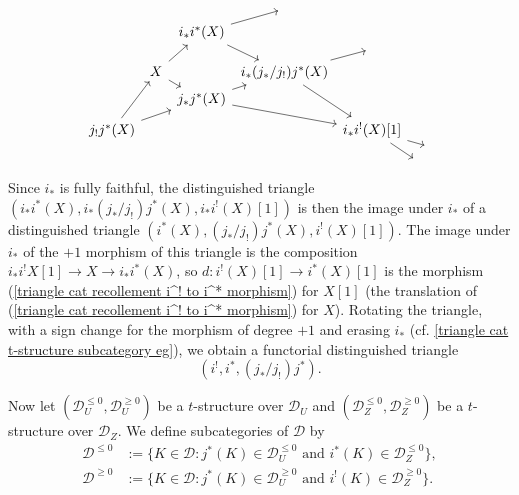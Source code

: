 \vspace*{-2mm}
\begin{equation}\label{triangle cat recollement octahedron}
\begin{tikzcd}[row sep=2pt,column sep=2pt]
&&&{}&\\
&&i_*i^*(X)\ar[ru]\ar[rdd]&&\\
&&&{}&{}\\
&X\ar[rd]\ar[ruu]&&i_*(j_*/j_!)j^*(X)\ar[ru]\ar[rddd]\\
&&j_*j^*(X)\ar[ru]\ar[rrdd]&&\\
&&&&\\
j_!j^*(X)\ar[ruuu]\ar[rruu]&&&&i_*i^!(X)[1]\ar[rdd]\ar[rrd]\\
&&&&&&{}\\
&&&&&{}&
\end{tikzcd}
\vspace*{-3mm}
\end{equation}
Since $i_*$ is fully faithful, the distinguished triangle $(i_*i^*(X),i_*(j_*/j_!)j^*(X),i_*i^!(X)[1])$ is then the image under $i_*$ of a distinguished triangle $(i^*(X),(j_*/j_!)j^*(X),i^!(X)[1])$. The image under $i_*$ of the $+1$ morphism of this triangle is the composition $i_*i^!X[1]\to X\to i_*i^*(X)$, so $d:i^!(X)[1]\to i^*(X)[1]$ is the morphism (\ref{triangle cat recollement i^! to i^* morphism}) for $X[1]$ (the translation of (\ref{triangle cat recollement i^! to i^* morphism}) for $X$). Rotating the triangle, with a sign change for the morphism of degree $+1$ and erasing $i_*$ (cf. \cref{triangle cat t-structure subcategory eg}), we obtain a functorial distinguished triangle
\begin{equation}\label{triangle cat recollement j_*/j_! dt-2}
(i^!,i^*,(j_*/j_!)j^*).
\end{equation}

Now let $(\mathcal{D}_U^{\leq 0},\mathcal{D}_U^{\geq 0})$ be a $t$-structure over $\mathcal{D}_U$ and $(\mathcal{D}_Z^{\leq 0},\mathcal{D}_Z^{\geq 0})$ be a $t$-structure over $\mathcal{D}_Z$. We define subcategories of $\mathcal{D}$ by
\begin{align*}
\mathcal{D}^{\leq 0}&:=\{K\in\mathcal{D}:\text{$j^*(K)\in\mathcal{D}_U^{\leq 0}$ and $i^*(K)\in\mathcal{D}_Z^{\leq 0}$}\},\\
\mathcal{D}^{\geq 0}&:=\{K\in\mathcal{D}:\text{$j^*(K)\in\mathcal{D}_U^{\geq 0}$ and $i^!(K)\in\mathcal{D}_Z^{\geq 0}$}\}.
\end{align*}

